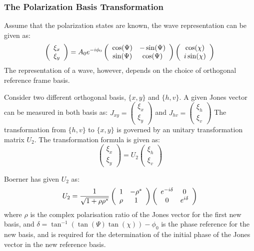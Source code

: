 \subsubsection{The Polarization Basis Transformation}

Assume that the polarization states are known, the wave representation can be given as:
\begin{equation}
\left( 
\begin{array}{c}
 \xi_x \\
 \xi_y
\end{array}
\right) 
= A_0 e^{-i \phi_0} \left(
\begin{array}{c c}
 \cos(\Psi) & -\sin(\Psi) \\
 \sin(\Psi) & \cos(\Psi)
\end{array}
\right) 
\left(
\begin{array}{c}
 \cos(\chi) \\
 i \sin(\chi)
\end{array}
\right) 
\end{equation}
The representation of a wave, however, depends on the choice of orthogonal reference frame basis.

Consider two different orthogonal basis, $\{ x,y \}$ and $\{ h,v \}$.
A given Jones vector can be measured in both basis as:
$J_{xy}= 
\left(
\begin{array}{c}
 \xi_x \\
 \xi_y
\end{array}
\right) $ and 
$J_{hv}
= \left(
\begin{array}{c}
 \xi_h \\
 \xi_v
\end{array}
\right)$
The transformation from $\{h,v\}$ to $\{x,y\}$ is governed by an unitary transformation matrix $U_2$.
The transformation formula is given as:
\begin{equation}
\left(
\begin{array}{c}
 \xi_x \\
 \xi_y
\end{array}
\right)
= U_2
\left(
\begin{array}{c}
 \xi_h \\
 \xi_v
\end{array}
\right)
\end{equation}

Boerner \cite{Boerner_1991_ProcsIEEE} has given $U_2$ as:
\begin{equation}
U_2 = \frac{1}{\sqrt{1+\rho\rho^*}}
\left(
\begin{array}{c c}
 1 & -\rho^* \\
 \rho & 1
\end{array}
\right)
\left(
\begin{array}{c c}
 e^{-i\delta} & 0 \\
 0 & e^{i\delta}
\end{array}
\right)
\end{equation}
where
	$\rho$ is the complex polarisation ratio of the Jones vector for the first new basis, and
	$\delta = \tan^{-1}(\tan(\Psi) \tan(\chi)) - \phi_0$ is the phase reference for the new basis, 
	and is required for the determination of the initial phase of the Jones vector in the new reference basis.

